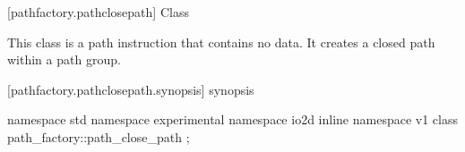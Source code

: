  [pathfactory.pathclosepath] {Class }

\pnum
{}
This class is a path instruction that contains no data. It creates a closed path within a path group.

 [pathfactory.pathclosepath.synopsis] { synopsis}

\begin{codeblock}
namespace std { namespace experimental { namespace io2d { inline namespace v1 {
  class path_factory::path_close_path {
  };
} } } }
\end{codeblock}
